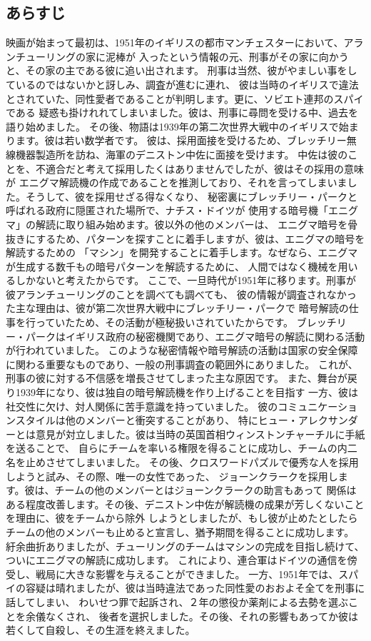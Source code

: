 \documentclass[a4j]{jarticle}
\begin{document}
\subsection{あらすじ}
映画が始まって最初は、1951年のイギリスの都市マンチェスターにおいて、アランチューリングの家に泥棒が
入ったという情報の元、刑事がその家に向かうと、その家の主である彼に追い出されます。
刑事は当然、彼がやましい事をしているのではないかと訝しみ、調査が進むに連れ、
彼は当時のイギリスで違法とされていた、同性愛者であることが判明します。更に、ソビエト連邦のスパイである
疑惑も掛けれれてしまいました。彼は、刑事に尋問を受ける中、過去を語り始めました。
その後、物語は1939年の第二次世界大戦中のイギリスで始まります。彼は若い数学者です。
彼は、採用面接を受けるため、ブレッチリー無線機器製造所を訪ね、海軍のデニストン中佐に面接を受けます。
中佐は彼のことを、不適合だと考えて採用したくはありませんでしたが、彼はその採用の意味が
エニグマ解読機の作成であることを推測しており、それを言ってしまいました。そうして、彼を採用せざる得なくなり、
秘密裏にブレッチリー・パークと呼ばれる政府に隠匿された場所で、ナチス・ドイツが
使用する暗号機「エニグマ」の解読に取り組み始めます。彼以外の他のメンバーは、
エニグマ暗号を骨抜きにするため、パターンを探すことに着手しますが、彼は、エニグマの暗号を解読するための
「マシン」を開発することに着手します。なぜなら、エニグマが生成する数千もの暗号パターンを解読するために、
人間ではなく機械を用いるしかないと考えたからです。
ここで、一旦時代が1951年に移ります。刑事が彼アランチューリングのことを調べても調べても、
彼の情報が調査されなかった主な理由は、彼が第二次世界大戦中にブレッチリー・パークで
暗号解読の仕事を行っていたため、その活動が極秘扱いされていたからです。
ブレッチリー・パークはイギリス政府の秘密機関であり、エニグマ暗号の解読に関わる活動が行われていました。
このような秘密情報や暗号解読の活動は国家の安全保障に関わる重要なものであり、一般の刑事調査の範囲外にありました。
これが、刑事の彼に対する不信感を増長させてしまった主な原因です。
また、舞台が戻り1939年になり、彼は独自の暗号解読機を作り上げることを目指す
一方、彼は社交性に欠け、対人関係に苦手意識を持っていました。
彼のコミュニケーションスタイルは他のメンバーと衝突することがあり、
特にヒュー・アレクサンダーとは意見が対立しました。彼は当時の英国首相ウィンストンチャーチルに手紙を送ることで、
自らにチームを率いる権限を得ることに成功し、チームの内二名を止めさせてしまいました。
その後、クロスワードパズルで優秀な人を採用しようと試み、その際、唯一の女性であった、
ジョーンクラークを採用します。彼は、チームの他のメンバーとはジョーンクラークの助言もあって
関係はある程度改善します。その後、デニストン中佐が解読機の成果が芳しくないことを理由に、彼をチームから除外
しようとしましたが、もし彼が止めたとしたらチームの他のメンバーも止めると宣言し、猶予期間を得ることに成功します。
紆余曲折ありましたが、チューリングのチームはマシンの完成を目指し続けて、ついにエニグマの解読に成功します。
これにより、連合軍はドイツの通信を傍受し、戦局に大きな影響を与えることができました。
一方、1951年では、スパイの容疑は晴れましたが、彼は当時違法であった同性愛のおおよそ全てを刑事に話してしまい、
わいせつ罪で起訴され、２年の懲役か薬剤による去勢を選ぶことを余儀なくされ、
後者を選択しました。その後、それの影響もあってか彼は若くして自殺し、その生涯を終えました。
\newpage
\end{document}
